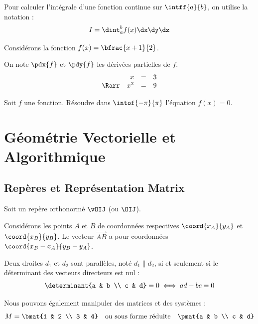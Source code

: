 \begin{theoreme}
	Pour calculer l'intégrale d'une fonction continue sur $\intff{a}{b}$, on utilise la notation :
	\[
		I = \dint_a^b f(x) \dx\dy\dz
	\]
\end{theoreme}

\begin{exemple}
	Considérons la fonction $f(x) = \bfrac{x+1}{2}$.
\end{exemple}

\begin{remarque}
	On note $\pdx{f}$ et $\pdy{f}$ les dérivées partielles de $f$.
	$$
		\begin{array}{rrcl}
			      & x   & = & 3 \\
			\Rarr & x^2 & = & 9
		\end{array}
	$$
\end{remarque}

\begin{exercice}
	Soit $f$ une fonction. Résoudre dans $\intof{-\pi}{\pi}$ l'équation $f(x) = 0$.
\end{exercice}

\chapter{Géométrie Vectorielle et Algorithmique}

\section{Repères et Représentation Matrix}

Soit un repère orthonormé $\vOIJ$ (ou $\OIJ$).

\begin{theoreme}
	Considérons les points $A$ et $B$ de coordonnées respectives $\coord{x_A}{y_A}$ et $\coord{x_B}{y_B}$.
	Le vecteur $\vec{AB}$ a pour coordonnées $\coord{x_B - x_A}{y_B - y_A}$.
\end{theoreme}

\begin{thm}
	Deux droites $d_1$ et $d_2$ sont parallèles, noté $d_1 \parallel d_2$, si et seulement si le déterminant des vecteurs directeurs est nul :
	\[
		\determinant{a & b \\ c & d} = 0 \iff ad - bc = 0
	\]
\end{thm}

Nous pouvons également manipuler des matrices et des systèmes :
\[
	M = \bmat{1 & 2 \\ 3 & 4} \quad \text{ou sous forme réduite} \quad \pmat{a & b \\ c & d}
\]

